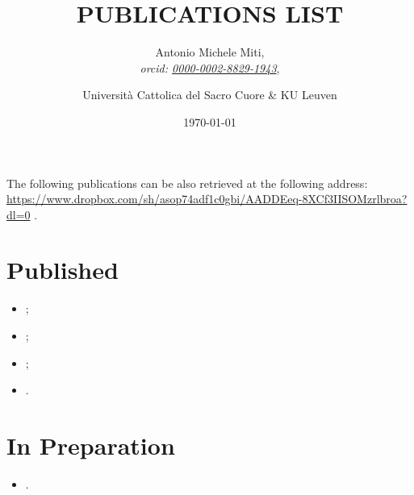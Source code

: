 \documentclass{article}
\title{PUBLICATIONS LIST}
\date{\today}
\author{
	Antonio Michele Miti,\\
	\emph{orcid: \href{https://orcid.org/0000-0002-8829-1943}{0000-0002-8829-1943}},
	\and 
	Università Cattolica del Sacro Cuore \& KU Leuven
}
\begin{document}
  

	\maketitle

	\noindent
  The following publications can be also retrieved at the following address:
  \\ 
  \url{https://www.dropbox.com/sh/asop74adf1c0gbi/AADDEeq-8XCf3IISOMzrlbroa?dl=0}
  .


  \section*{Published}
	  \begin{itemize}
 	   \item {};
 	   \item {};
 	   \item {};
 	   \item {}.
	  \end{itemize}




  
  \section*{In Preparation}
	  \begin{itemize}
 	   \item {}.
	  \end{itemize}

  
\end{document}

